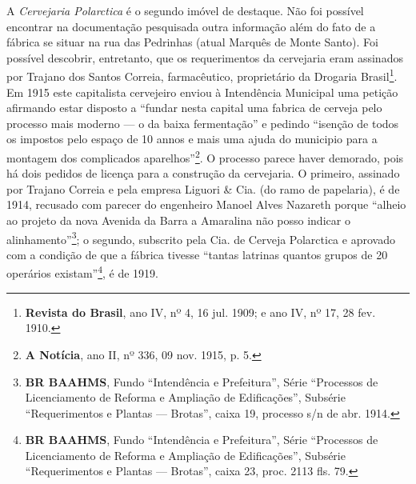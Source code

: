 A \textit{Cervejaria Polarctica} é o segundo imóvel de destaque. Não foi possível encontrar na documentação pesquisada outra informação além do fato de a fábrica se situar na rua das Pedrinhas (atual Marquês de Monte Santo). Foi possível descobrir, entretanto, que os requerimentos da cervejaria eram assinados por Trajano dos Santos Correia, farmacêutico, proprietário da Drogaria Brasil\footnote{\textbf{Revista do Brasil}, ano IV, nº 4, 16 jul. 1909; e ano IV, nº 17, 28 fev. 1910.}. Em 1915 este capitalista cervejeiro enviou à Intendência Municipal uma petição afirmando estar disposto a ``fundar nesta capital uma fabrica de cerveja pelo processo mais moderno --- o da baixa fermentação'' e pedindo ``isenção de todos os impostos pelo espaço de 10 annos e mais uma ajuda do municipio para a montagem dos complicados aparelhos''\footnote{\textbf{A Notícia}, ano II, nº 336, 09 nov. 1915, p. 5.}. O processo parece haver demorado, pois há dois pedidos de licença para a construção da cervejaria. O primeiro, assinado por Trajano Correia e pela empresa Liguori \& Cia. (do ramo de papelaria), é de 1914, recusado com parecer do engenheiro Manoel Alves Nazareth porque ``alheio ao projeto da nova Avenida da Barra a Amaralina não posso indicar o alinhamento''\footnote{\textbf{BR BAAHMS}, Fundo ``Intendência e Prefeitura'', Série ``Processos de Licenciamento de Reforma e Ampliação de Edificações'', Subsérie ``Requerimentos e Plantas --- Brotas'', caixa 19, processo s/n de abr. 1914.}; o segundo, subscrito pela Cia. de Cerveja Polarctica e aprovado com a condição de que a fábrica tivesse ``tantas latrinas quantos grupos de 20 operários existam''\footnote{\textbf{BR BAAHMS}, Fundo ``Intendência e Prefeitura'', Série ``Processos de Licenciamento de Reforma e Ampliação de Edificações'', Subsérie ``Requerimentos e Plantas --- Brotas'', caixa 23, proc. 2113 fls. 79.}, é de 1919.

